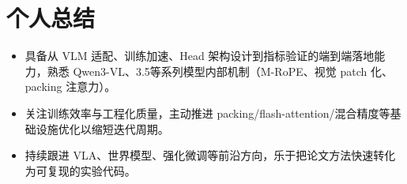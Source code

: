 \documentclass{resume}
\begin{document}
\section{个人总结}

\begin{itemize}
  \item 具备从 VLM 适配、训练加速、Head 架构设计到指标验证的端到端落地能力，熟悉 Qwen3-VL、3.5等系列模型内部机制（M-RoPE、视觉 patch 化、packing 注意力）。
  \item 关注训练效率与工程化质量，主动推进 packing/flash-attention/混合精度等基础设施优化以缩短迭代周期。
  \item 持续跟进 VLA、世界模型、强化微调等前沿方向，乐于把论文方法快速转化为可复现的实验代码。
\end{itemize}
\end{document}
